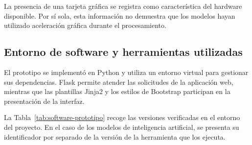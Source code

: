 La presencia de una tarjeta gráfica se registra como
característica del hardware disponible. Por sí sola,
esta información no demuestra que los modelos hayan
utilizado aceleración gráfica durante el procesamiento.

\subsection{Entorno de software y herramientas utilizadas}


El prototipo se implementó en Python y utiliza un entorno
virtual para gestionar sus dependencias. Flask permite
atender las solicitudes de la aplicación web, mientras
que las plantillas Jinja2 y los estilos de Bootstrap
participan en la presentación de la interfaz.

La Tabla~\ref{tab:software-prototipo} recoge las versiones
verificadas en el entorno del proyecto. En el caso de los
modelos de inteligencia artificial, se presenta su
identificador por separado de la versión de la herramienta
que los ejecuta.

